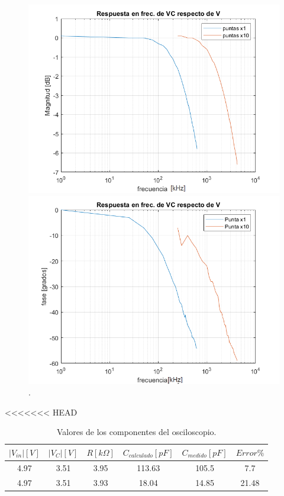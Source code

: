 \begin{figure}[H]
\centering
\begin{minipage}{.5\textwidth}
\includegraphics[scale=0.45]{1-8a.png}
\end{minipage}%
\begin{minipage}{.5\textwidth}
\includegraphics[scale=0.45]{1-8b.png}
\end{minipage}
\caption{.}
\label{puntas}
\end{figure}


<<<<<<< HEAD
\begin{table}[!htb]
\centering
\begin{tabular}{|c|c|c|c|c|c|}
\hline 
$|V_{in}|[V]$ & $|V_{C}|[V]$ & $R[k\Omega]$ & $C_{calculado}[pF]$ & $C_{medido}[pF]$ & $Error\%$\\
\hline 
\hline 
4.97 & 3.51 & 3.95 & 113.63 & 105.5 & 7.7\\
\hline 
4.97 & 3.51 & 3.93 & 18.04 & 14.85 & 21.48\\
\hline 
\end{tabular}
\caption{Valores de los componentes del osciloscopio.}
\label{tablaOsc}
\end{table}


